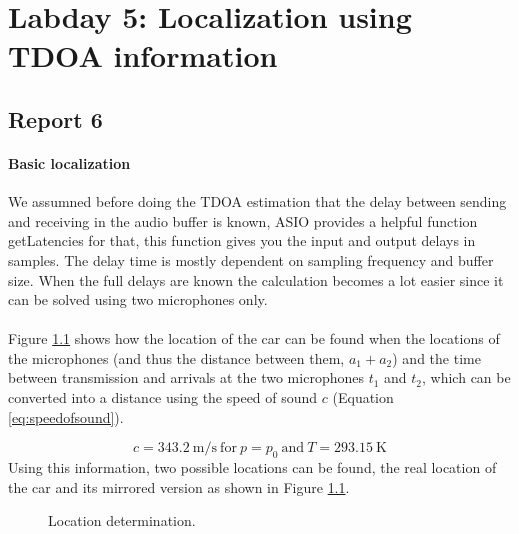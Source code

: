 \documentclass[final]{scrreprt} %
\begin{document}
\chapter{Labday 5: Localization using TDOA information}
\label{ch:labday5}
\section{Report 6}
\subsubsection{Basic localization}
We assumned before doing the TDOA estimation that the delay between sending and receiving in the audio buffer is known, ASIO provides a helpful function getLatencies for that, this function gives you the input and output delays in samples.
The delay time is mostly dependent on sampling frequency and buffer size.
When the full delays are known the calculation becomes a lot easier since it can be solved using two microphones only.
\\ \\
Figure \ref{fig:location} shows how the location of the car can be found when the locations of the microphones (and thus the distance between them, $a_1 + a_2$) and the time between transmission and arrivals at the two microphones $t_1$ and $t_2$, which can be converted into a distance using the speed of sound $c$ (Equation \ref{eq:speedofsound}).

\begin{equation}
c=\SI{343.2}{\meter\per\second}~\mathrm{for}~p = p_0~\mathrm{and}~T = \SI{293.15}{\kelvin}
\label{eq:speedofsound}
\end{equation}
Using this information, two possible locations can be found, the real location of the car and its mirrored version as shown in Figure \ref{fig:location}.

\begin{figure} [H]
\centering
	\caption{Location determination.}
	\label{fig:location}
\end{figure}
\end{document}

